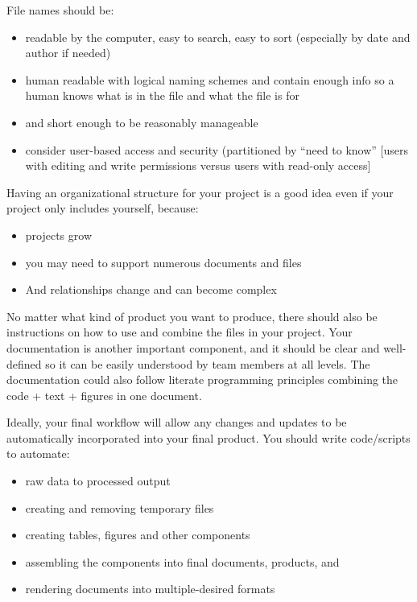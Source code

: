 \documentclass[]{book}
\providecommand{\tightlist}{%
  \setlength{\itemsep}{0pt}\setlength{\parskip}{0pt}}
\theoremstyle{definition}
\theoremstyle{definition}
\theoremstyle{definition}
\theoremstyle{remark}
\begin{document}
File names should be:

\begin{itemize}
\tightlist
\item
  readable by the computer, easy to search, easy to sort (especially by
  date and author if needed)
\item
  human readable with logical naming schemes and contain enough info so
  a human knows what is in the file and what the file is for
\item
  and short enough to be reasonably manageable
\item
  consider user-based access and security (partitioned by ``need to
  know'' {[}users with editing and write permissions versus users with
  read-only access{]}
\end{itemize}

Having an organizational structure for your project is a good idea even
if your project only includes yourself, because:

\begin{itemize}
\tightlist
\item
  projects grow
\item
  you may need to support numerous documents and files
\item
  And relationships change and can become complex
\end{itemize}

No matter what kind of product you want to produce, there should also be
instructions on how to use and combine the files in your project. Your
documentation is another important component, and it should be clear and
well-defined so it can be easily understood by team members at all
levels. The documentation could also follow literate programming
principles combining the code + text + figures in one document.

Ideally, your final workflow will allow any changes and updates to be
automatically incorporated into your final product. You should write
code/scripts to automate:

\begin{itemize}
\tightlist
\item
  raw data to processed output
\item
  creating and removing temporary files
\item
  creating tables, figures and other components
\item
  assembling the components into final documents, products, and
\item
  rendering documents into multiple-desired formats
\end{itemize}
\end{document}
